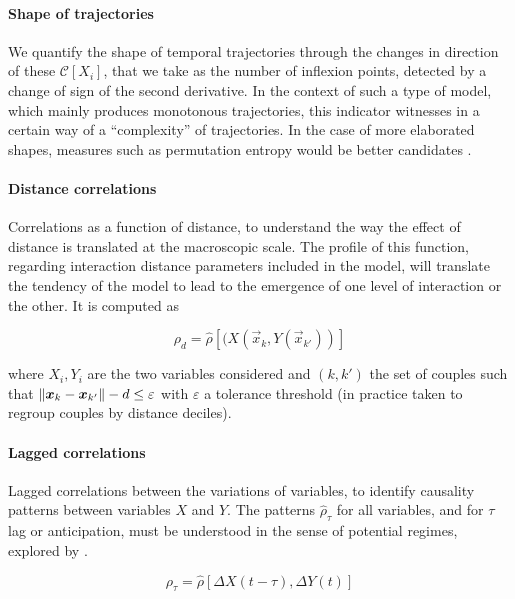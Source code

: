 \paragraph{Shape of trajectories}

We quantify the shape of temporal trajectories through the changes in direction of these $\mathcal{C}\left[X_i\right]$, that we take as the number of inflexion points, detected by a change of sign of the second derivative. %
In the context of such a type of model, which mainly produces monotonous trajectories, this indicator witnesses in a certain way of a ``complexity'' of trajectories. In the case of more elaborated shapes, measures such as permutation entropy would be better candidates \cite{scarpino2017predictability}.
	
	
\paragraph{Distance correlations}

Correlations as a function of distance, to understand the way the effect of distance is translated at the macroscopic scale. The profile of this function, regarding interaction distance parameters included in the model, will translate the tendency of the model to lead to the emergence of one level of interaction or the other. It is computed as

\begin{equation}
\rho_d = \hat{\rho}\left[(X(\vec{x}_k,Y(\vec{x}_{k'}))\right]
\end{equation}

where $X_i, Y_i$ are the two variables considered and $(k,k')$ the set of couples such that $\norm{\vec{x}_k-\vec{x}_{k'}} - d \leq \varepsilon$ with $\varepsilon$ a tolerance threshold (in practice taken to regroup couples by distance deciles).


\paragraph{Lagged correlations}

Lagged correlations between the variations of variables, to identify causality patterns between variables $X$ and $Y$. The patterns $\hat{\rho}_{\tau}$ for all variables, and for $\tau$ lag or anticipation, must be understood in the sense of potential regimes, explored by \cite{raimbault2017identification}.

\begin{equation}
\rho_{\tau} = \hat{\rho}\left[\Delta X(t-\tau),\Delta Y(t)\right]
\end{equation}



